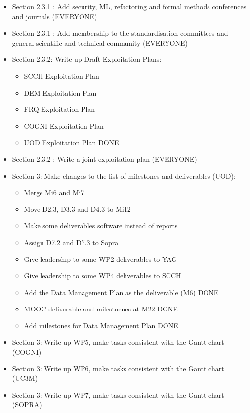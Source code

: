 \documentclass[a4paper,11pt]{article}
\begin{document}
\begin{itemize}
\item Section 2.3.1 : Add security, ML, refactoring and formal methods conferences and journals (EVERYONE)

\item Section 2.3.1 : Add membership to the standardisation committees and general scientific and technical community (EVERYONE)

\item Section 2.3.2: Write up Draft Exploitation Plans:
\begin{itemize}
\item SCCH Exploitation Plan
\item DEM Exploitation Plan
\item FRQ Exploitation Plan
\item COGNI Exploitation Plan
\item UOD Exploitation Plan DONE
\end{itemize}

\item Section 2.3.2 : Write a joint exploitation plan (EVERYONE)

\item Section 3: Make changes to the list of milestones and deliverables (UOD):
\begin{itemize}
\item Merge Mi6 and Mi7
\item Move D2.3, D3.3 and D4.3 to Mi12
\item Make some deliverables software instead of reports
\item Assign D7.2 and D7.3 to Sopra
\item Give leadership to some WP2 deliverables to YAG
\item Give leadership to some WP4 deliverables to SCCH
\item Add the Data Management Plan as the deliverable (M6) DONE
\item MOOC deliverable and milestoenes at M22 DONE
\item Add milestones for Data Management Plan DONE
\end{itemize}

\item Section 3: Write up WP5, make tasks consistent with the Gantt chart (COGNI)

\item Section 3: Write up WP6, make tasks consistent with the Gantt chart (UC3M)

\item Section 3: Write up WP7, make tasks consistent with the Gantt chart (SOPRA)


\end{itemize}
\end{document}
